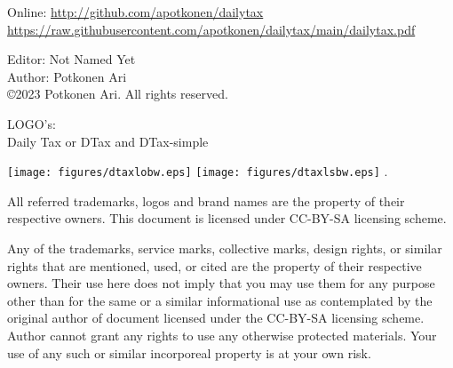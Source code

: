 %
%
\label{rights}
\vspace*{\fill}
Online: \url{http://github.com/apotkonen/dailytax} \cite{DayTax}\\
{\scriptsize\url{https://raw.githubusercontent.com/apotkonen/dailytax/main/dailytax.pdf}}
\vspace*{\fill}

Editor: Not Named Yet\\
Author: Potkonen Ari\\
\copyright 2023 Potkonen Ari. All rights reserved.
\vspace{\baselineskip}
\vspace*{\fill}

LOGO's:\\
Daily Tax\textsuperscript{\texttrademark}
or DTax\textsuperscript{\texttrademark} and
DTax\textsuperscript{\texttrademark}-simple

\texttt{[image: figures/dtaxlobw.eps]}
\texttt{[image: figures/dtaxlsbw.eps]}
.
\vspace*{\fill}

All referred trademarks,
logos and brand names are the property of their respective owners.
This document is licensed under CC-BY-SA licensing scheme\cite{CC-BY-SA-40}.
\vspace{\baselineskip}

Any of the trademarks, service marks, collective marks,
design rights, or similar rights that are mentioned, used,
or cited are the property of their respective owners.
Their use here does not imply that you may use them for any purpose other
than for the same or a similar informational use as contemplated by the
original author of document licensed under the CC-BY-SA licensing scheme.
Author cannot grant any rights to use any otherwise protected materials.
Your use of any such or similar incorporeal property is at your own risk. 
